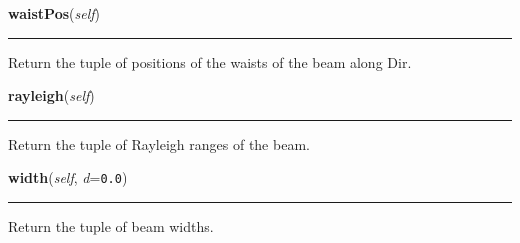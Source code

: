 \hspace{.8\funcindent}\begin{boxedminipage}{\funcwidth}

    \raggedright \textbf{waistPos}(\textit{self})

    \vspace{-1.5ex}

    \rule{\textwidth}{0.5\fboxrule}
\setlength{\parskip}{2ex}
    Return the tuple of positions of the waists of the beam along Dir.

\setlength{\parskip}{1ex}
    \end{boxedminipage}

    \label{theia:optics:beam:GaussianBeam:rayleigh}

    \vspace{0.5ex}

\hspace{.8\funcindent}\begin{boxedminipage}{\funcwidth}

    \raggedright \textbf{rayleigh}(\textit{self})

    \vspace{-1.5ex}

    \rule{\textwidth}{0.5\fboxrule}
\setlength{\parskip}{2ex}
    Return the tuple of Rayleigh ranges of the beam.

\setlength{\parskip}{1ex}
    \end{boxedminipage}

    \label{theia:optics:beam:GaussianBeam:width}

    \vspace{0.5ex}

\hspace{.8\funcindent}\begin{boxedminipage}{\funcwidth}

    \raggedright \textbf{width}(\textit{self}, \textit{d}={\tt 0.0})

    \vspace{-1.5ex}

    \rule{\textwidth}{0.5\fboxrule}
\setlength{\parskip}{2ex}
    Return the tuple of beam widths.

\setlength{\parskip}{1ex}
    \end{boxedminipage}

